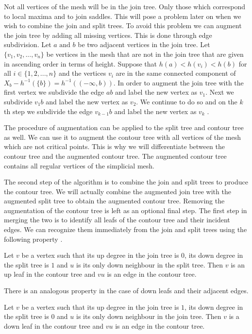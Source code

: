 Not all vertices of the mesh will be in the join tree. Only those which correspond to local maxima and to join saddles. This will pose a problem later on when we wish to combine the join and split trees. To avoid this problem we can augment the join tree by adding all missing vertices. This is done through edge subdivision. Let $a \text{ and } b$ be two adjacent vertices in the join tree.  Let $\{v_1, v_2, ..., v_n\}$ be vertices in the mesh that are not in the join tree that are given in ascending order in terms of height.  Suppose that $h(a) < h(v_i) < h(b)$ for all $i \in \{1, 2, ..., n\}$ and the vertices $v_i$ are in the same connected component of $X_b - h^{-1}(\{b\}) = h^{-1}((-\infty, b))$. In order to augment the join tree with the first vertex we subdivide the edge $ab$ and label the new vertex as $v_1$. Next we subdivide $v_1b$ and label the new vertex as $v_2$. We continue to do so and on the $k$th step we subdivide the edge
$ v_{k-1}b $ and label the new vertex as $v_k$  .

The procedure of augmentation can be applied to the split tree and contour tree as well. We can use it to augment the contour tree with all vertices of the mesh which are not critical points. This is why we will differentiate between the contour tree and the augmented contour tree. The augmented contour tree contains all regular vertices of the simplicial mesh.

The second step of the algorithm is to combine the join and split trees to produce the contour tree. We will actually combine the augmented join tree with the augmented split tree to obtain the augmented contour tree. Removing the augmentation of the contour tree is left as an optional final step. The first step in merging the two is to identify all leafs of the contour tree and their incident edges. We can recognize them immediately from the join and split trees using the following property \cite{carr-masters}.

\begin{property} Let $v$ be a vertex such that its up degree in the join tree is $0$, its down degree in the split tree is $1$ and $u$ is its only down neighbour in the split tree. Then $v$ is an up leaf in the contour tree and $vu$ is an edge in the contour tree.  \end{property}

There is an analogous property in the case of down leafs and their adjacent edges.

\begin{property} Let $v$ be a vertex such that its up degree in the join tree is $1$, its down degree in the split tree is $0$ and $u$ is its only down neighbour in the join tree. Then $v$ is a down leaf in the contour tree and $vu$ is an edge in the contour tree.  \end{property}

